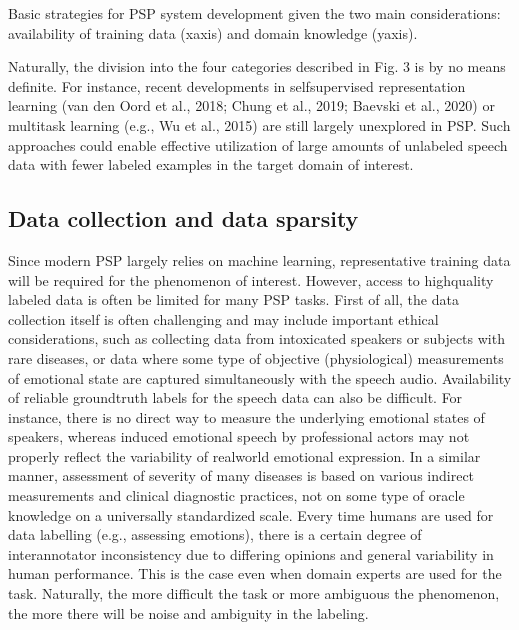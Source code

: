 \documentclass[letterpaper,10pt,english]{jupyterBook}
\begin{document}
\sphinxAtStartPar
{}

\sphinxAtStartPar
{} Basic strategies for PSP system development given the two
main considerations: availability of training data (x\sphinxhyphen{}axis) and domain
knowledge (y\sphinxhyphen{}axis).

\sphinxAtStartPar
Naturally, the division into the four categories described in Fig. 3 is
by no means definite. For instance, recent developments in
self\sphinxhyphen{}supervised representation learning (van den Oord et al., 2018;
Chung et al., 2019; Baevski et al., 2020) or multitask learning (e.g.,
Wu et al., 2015) are still largely unexplored in PSP. Such approaches
could enable effective utilization of large amounts of unlabeled speech
data with fewer labeled examples in the target domain of interest.


\subsection{Data collection and data sparsity}
\label{\detokenize{Recognition/Paralinguistic_speech_processing:data-collection-and-data-sparsity}}
\sphinxAtStartPar
Since modern PSP largely relies on machine learning, representative
training data will be required for the phenomenon of interest. However,
access to high\sphinxhyphen{}quality labeled data is often be limited for many PSP
tasks. First of all, the data collection itself is often challenging and
may include important ethical considerations, such as collecting data
from intoxicated speakers or subjects with rare diseases, or data where
some type of objective (physiological) measurements of emotional state
are captured simultaneously with the speech audio. Availability of
reliable ground\sphinxhyphen{}truth labels for the speech data can also be difficult.
For instance, there is no direct way to measure the underlying emotional
states of speakers, whereas induced emotional speech by professional
actors may not properly reflect the variability of real\sphinxhyphen{}world emotional
expression. In a similar manner, assessment of severity of many diseases
is based on various indirect measurements and clinical diagnostic
practices, not on some type of oracle knowledge on a universally
standardized scale. Every time humans are used for data labelling (e.g.,
assessing emotions), there is a certain degree of inter\sphinxhyphen{}annotator
inconsistency due to differing opinions and general variability in human
performance. This is the case even when domain experts are used for the
task. Naturally, the more difficult the task or more ambiguous the
phenomenon, the more there will be noise and ambiguity in the labeling.
\end{document}
